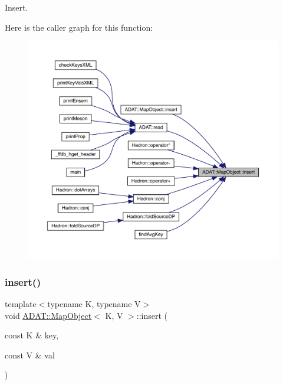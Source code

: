 Insert. 

Here is the caller graph for this function\+:
\nopagebreak
\begin{figure}[H]
\begin{center}
\leavevmode
\includegraphics[width=350pt]{da/d29/classADAT_1_1MapObject_a5389738841dca1228aefe6935c464a78_icgraph}
\end{center}
\end{figure}
\mbox{\label{classADAT_1_1MapObject_a5389738841dca1228aefe6935c464a78}} 
\subsubsection{\texorpdfstring{insert()}{insert()}\hspace{0.1cm}{\footnotesize\ttfamily [2/6]}}
{\footnotesize\ttfamily template$<$typename K, typename V$>$ \\
void \mbox{\hyperlink{classADAT_1_1MapObject}{A\+D\+A\+T\+::\+Map\+Object}}$<$ K, V $>$\+::insert (\begin{DoxyParamCaption}\item[{const K \&}]{key,  }\item[{const V \&}]{val }\end{DoxyParamCaption})\hspace{0.3cm}{\ttfamily [inline]}}



